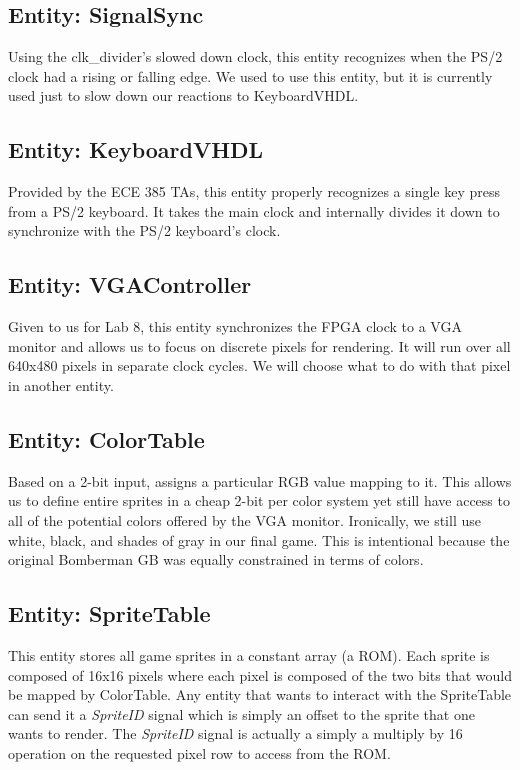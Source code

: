 \documentclass[10pt,a4paper]{article}
\begin{document}
\subsection{Entity: SignalSync}
Using the clk\_divider's slowed down clock, this entity recognizes when the PS/2 clock had a rising or falling edge. We used to use this entity, but it is currently used just to slow down our reactions to KeyboardVHDL.

\subsection{Entity: KeyboardVHDL}
Provided by the ECE 385 TAs, this entity properly recognizes a single key press from a PS/2 keyboard. It takes the main clock and internally divides it down to synchronize with the PS/2 keyboard's clock.

\subsection{Entity: VGAController}
Given to us for Lab 8, this entity synchronizes the FPGA clock to a VGA monitor and allows us to focus on discrete pixels for rendering. It will run over all 640x480 pixels in separate clock cycles. We will choose what to do with that pixel in another entity.

\subsection{Entity: ColorTable}
Based on a 2-bit input, assigns a particular RGB value mapping to it. This allows us to define entire sprites in a cheap 2-bit per color system yet still have access to all of the potential colors offered by the VGA monitor. Ironically, we still use white, black, and shades of gray in our final game. This is intentional because the original Bomberman GB was equally constrained in terms of colors.

\subsection{Entity: SpriteTable}
This entity stores all game sprites in a constant array (a ROM). Each sprite is composed of 16x16 pixels where each pixel is composed of the two bits that would be mapped by ColorTable. Any entity that wants to interact with the SpriteTable can send it a \emph{SpriteID} signal which is simply an offset to the sprite that one wants to render. The \emph{SpriteID} signal is actually a simply a multiply by 16 operation on the requested pixel row to access from the ROM.
\end{document}

